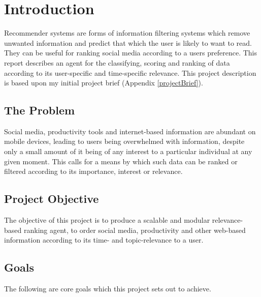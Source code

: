 \chapter{Introduction}

Recommender systems are forms of information filtering systems which remove unwanted information and predict that which the user is likely to want to read. They can be useful for ranking social media according to a users preference. This report describes an agent for the classifying, scoring and ranking of data according to its user-specific and time-specific relevance. This project description is based upon my initial project brief (Appendix \ref{projectBrief}).

\section{The Problem}

Social media, productivity tools and internet-based information are abundant on mobile devices, leading to users being overwhelmed with information, despite only a small amount of it being of any interest to a particular individual at any given moment. This calls for a means by which such data can be ranked or filtered according to its importance, interest or relevance.

\section{Project Objective}

The objective of this project is to produce a scalable and modular relevance-based ranking agent, to order social media, productivity and other web-based information according to its time- and topic-relevance to a user.

\section{Goals}

The following are core goals which this project sets out to achieve.

